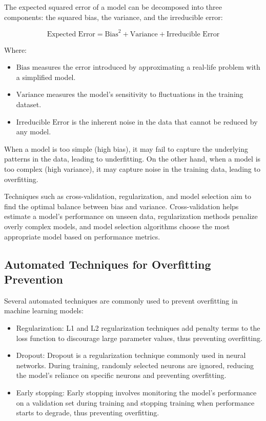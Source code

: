 \documentclass[12pt]{book} %
\begin{document}
The expected squared error of a model can be decomposed into three components: the squared bias, the variance, and the irreducible error:

\[
\text{Expected Error} = \text{Bias}^2 + \text{Variance} + \text{Irreducible Error}
\]

Where:
\begin{itemize}
    \item $\text{Bias}$ measures the error introduced by approximating a real-life problem with a simplified model.
    \item $\text{Variance}$ measures the model's sensitivity to fluctuations in the training dataset.
    \item $\text{Irreducible Error}$ is the inherent noise in the data that cannot be reduced by any model.
\end{itemize}

When a model is too simple (high bias), it may fail to capture the underlying patterns in the data, leading to underfitting. On the other hand, when a model is too complex (high variance), it may capture noise in the training data, leading to overfitting.

Techniques such as cross-validation, regularization, and model selection aim to find the optimal balance between bias and variance. Cross-validation helps estimate a model's performance on unseen data, regularization methods penalize overly complex models, and model selection algorithms choose the most appropriate model based on performance metrics.

\subsection{Automated Techniques for Overfitting Prevention}

Several automated techniques are commonly used to prevent overfitting in machine learning models:

\begin{itemize}
    \item Regularization: L1 and L2 regularization techniques add penalty terms to the loss function to discourage large parameter values, thus preventing overfitting.
    \item Dropout: Dropout is a regularization technique commonly used in neural networks. During training, randomly selected neurons are ignored, reducing the model's reliance on specific neurons and preventing overfitting.
    \item Early stopping: Early stopping involves monitoring the model's performance on a validation set during training and stopping training when performance starts to degrade, thus preventing overfitting.
\end{itemize}
\end{document}
